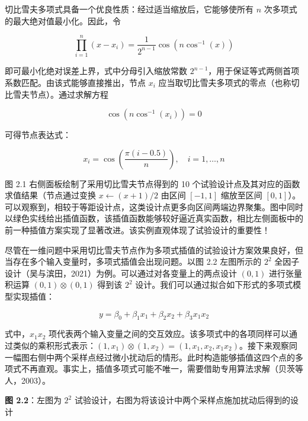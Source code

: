 \documentclass{ctexart}
\begin{document}
切比雪夫多项式具备一个优良性质：经过适当缩放后，它能够使所有 $n$ 次多项式的最大绝对值最小化。因此，令

\begin{equation*}
\prod_{i=1}^n(x-x_i)=\frac{1}{2^{n-1}}\cos\left(n\cos^{-1}(x)\right)
\end{equation*}

即可最小化绝对误差上界，式中分母引入缩放常数 $2^{n-1}$，用于保证等式两侧首项系数匹配。由该式能够直接推出，节点 $x_i$ 应当取切比雪夫多项式的零点（也称切比雪夫节点）。通过求解方程

\begin{equation*}
\cos\left(n\cos^{-1}(x_i)\right)=0
\end{equation*}

可得节点表达式：

\begin{equation*}
x_i=\cos\left(\frac{\pi(i-0.5)}{n}\right),\quad i=1,\dots,n
\tag{2.5}
\end{equation*}

图 2.1 右侧面板绘制了采用切比雪夫节点得到的 10 个试验设计点及其对应的函数求值结果（节点通过变换 $x\leftarrow(x+1)/2$ 由区间 $[-1,1]$ 缩放至区间 $[0,1]$）。可以观察到，相较于等距设计点，这类设计点更多向区间两端边界聚集。图中同时以绿色实线给出插值函数，该插值函数能够较好逼近真实函数，相比左侧面板中的前一种插值方案实现了显著改进。该实例直观体现了试验设计的重要性！

尽管在一维问题中采用切比雪夫节点作为多项式插值的试验设计方案效果良好，但当存在多个输入变量时，多项式插值会出现问题。以图 2.2 左图所示的 $2^2$ 全因子设计（吴与滨田，2021）为例。可以通过对各变量上的两点设计 $(0,1)$ 进行张量积运算 $(0,1)\otimes(0,1)$ 得到该 $2^2$ 设计。我们可以通过拟合如下形式的多项式模型实现插值：

\begin{equation*}
y=\beta_0+\beta_1x_1+\beta_2x_2+\beta_3x_1x_2
\end{equation*}

式中，$x_1x_2$ 项代表两个输入变量之间的交互效应。该多项式中的各项同样可以通过类似的乘积形式表示：$(1,x_1)\otimes(1,x_2)=(1,x_1,x_2,x_1x_2)$。接下来观察同一幅图右侧中两个采样点经过微小扰动后的情形。此时构造能够插值这四个点的多项式不再直观。事实上，插值多项式可能不唯一，需要借助专用算法求解（贝茨等人，2003）。

\begin{mdquote}
\textbf{图 2.2}：左图为 $2^2$ 试验设计，右图为将该设计中两个采样点施加扰动后得到的设计
\end{mdquote}
\end{document}
